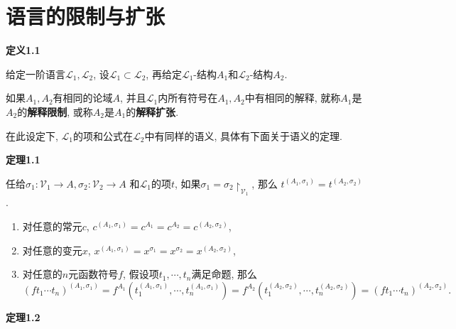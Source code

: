 \documentclass[UTF8]{ctexart}
\begin{document}
\setlength{\abovedisplayskip}{1pt}
\setlength{\belowdisplayskip}{1pt}

\section{语言的限制与扩张}

\hypertarget{sec:定义1.1}{}
\noindent\textbf{定义1.1}

给定一阶语言$\mathcal{L}_1,\mathcal{L}_2$, 设$\mathcal{L}_1\subset\mathcal{L}_2$,
再给定$\mathcal{L}_1$-结构$A_1$和$\mathcal{L}_2$-结构$A_2$.

如果$A_1,A_2$有相同的论域$A$, 并且$\mathcal{L}_1$内所有符号在$A_1,A_2$中有相同的解释,
就称$A_1$是$A_2$的\textbf{解释限制}, 或称$A_2$是$A_1$的\textbf{解释扩张}.

\vspace{10pt}

在此设定下, $\mathcal{L}_1$的项和公式在$\mathcal{L}_2$中有同样的语义,
具体有下面关于语义的定理.

\vspace{10pt}

\hypertarget{sec:定理1.1}{}
\noindent\textbf{定理1.1}

任给$\sigma_1:\mathcal{V}_1\to A,\sigma_2:\mathcal{V}_2\to A$
和$\mathcal{L}_1$的项$t$, 如果$\sigma_1=\sigma_2\!\restriction_{\mathcal{V}_1}$, 那么
$t^{(A_1,\sigma_1)}=t^{(A_2,\sigma_2)}$.


\begin{enumerate}
    \item 对任意的常元$c$, $c^{(A_1,\sigma_1)}=c^{A_1}=c^{A_2}=c^{(A_2,\sigma_2)}$,
    \item 对任意的变元$x$,
    $x^{(A_1,\sigma_1)}=x^{\sigma_1}=x^{\sigma_2}=x^{(A_2,\sigma_2)}$,
    \item 对任意的$n$元函数符号$f$, 假设项$t_1,\cdots,t_n$满足命题, 那么
    \begin{equation*}
        (ft_1\cdots t_n)^{(A_1,\sigma_1)}
        =f^{A_1}(t_1^{(A_1,\sigma_1)},\cdots,t_n^{(A_1,\sigma_1)})
        =f^{A_2}(t_1^{(A_2,\sigma_2)},\cdots,t_n^{(A_2,\sigma_2)})
        =(ft_1\cdots t_n)^{(A_2,\sigma_2)}.
    \tag*{\qedsymbol}\end{equation*}
\end{enumerate}

\vspace{10pt}

\hypertarget{sec:定理1.2}{}
\noindent\textbf{定理1.2}
\end{document}
